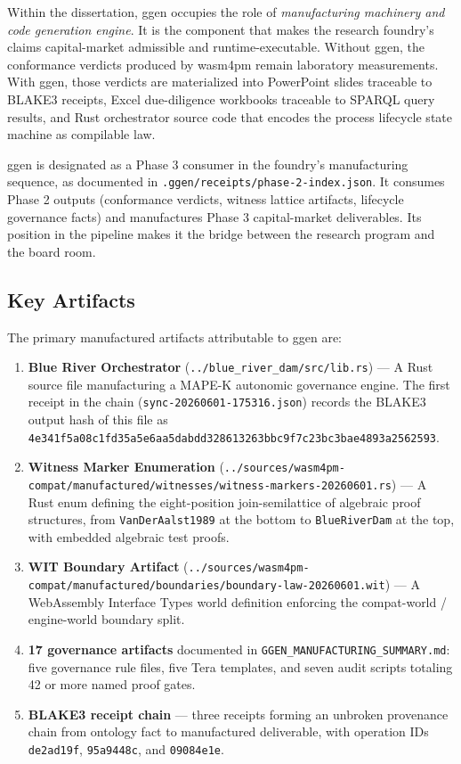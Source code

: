 Within the dissertation, ggen occupies the role of \emph{manufacturing machinery and code
generation engine}. It is the component that makes the research foundry's claims capital-market
admissible and runtime-executable. Without ggen, the conformance verdicts produced by wasm4pm
remain laboratory measurements. With ggen, those verdicts are materialized into PowerPoint slides
traceable to BLAKE3 receipts, Excel due-diligence workbooks traceable to SPARQL query results, and
Rust orchestrator source code that encodes the process lifecycle state machine as compilable law.

ggen is designated as a Phase 3 consumer in the foundry's manufacturing sequence, as documented in
\texttt{.ggen/receipts/phase-2-index.json}. It consumes Phase 2 outputs (conformance verdicts,
witness lattice artifacts, lifecycle governance facts) and manufactures Phase 3 capital-market
deliverables. Its position in the pipeline makes it the bridge between the research program and
the board room.

\subsection{Key Artifacts}
\label{sec:ggen-identity-artifacts}

The primary manufactured artifacts attributable to ggen are:

\begin{enumerate}
  \item \textbf{Blue River Orchestrator} (\texttt{../blue\_river\_dam/src/lib.rs}) --- A Rust
    source file manufacturing a MAPE-K autonomic governance engine. The first receipt in the chain
    (\texttt{sync-20260601-175316.json}) records the BLAKE3 output hash of this file as
    \texttt{4e341f5a08c1fd35a5e6aa5dabdd328613263bbc9f7c23bc3bae4893a2562593}.
  \item \textbf{Witness Marker Enumeration}
    (\texttt{../sources/wasm4pm-compat/manufactured/witnesses/witness-markers-20260601.rs}) --- A
    Rust enum defining the eight-position join-semilattice of algebraic proof structures, from
    \texttt{VanDerAalst1989} at the bottom to \texttt{BlueRiverDam} at the top, with embedded
    algebraic test proofs.
  \item \textbf{WIT Boundary Artifact}
    (\texttt{../sources/wasm4pm-compat/manufactured/boundaries/boundary-law-20260601.wit}) --- A
    WebAssembly Interface Types world definition enforcing the compat-world / engine-world
    boundary split.
  \item \textbf{17 governance artifacts} documented in \texttt{GGEN\_MANUFACTURING\_SUMMARY.md}:
    five governance rule files, five Tera templates, and seven audit scripts totaling 42 or more
    named proof gates.
  \item \textbf{BLAKE3 receipt chain} --- three receipts forming an unbroken provenance chain
    from ontology fact to manufactured deliverable, with operation IDs \texttt{de2ad19f},
    \texttt{95a9448c}, and \texttt{09084e1e}.
\end{enumerate}
